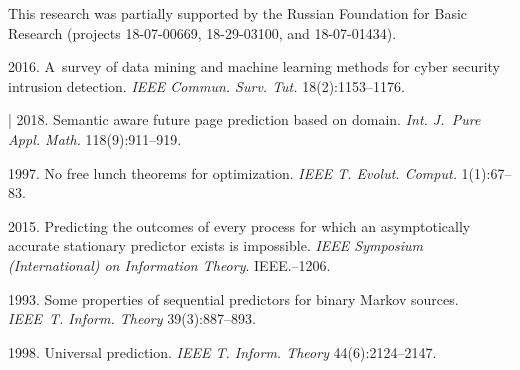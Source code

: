 


\vspace*{-19pt}

\Ack

\vspace*{-5pt}

\noindent
This research was partially supported by the Russian Foundation for Basic Research (projects 
18-07-00669,  
18-29-03100, and 18-07-01434).

\vspace*{-3pt}

 \begin{multicols}{2}

\renewcommand{\bibname}{\protect\rmfamily References}

{\small\frenchspacing
 {%
 \begin{thebibliography}{99}

 2016. A~survey of data mining and machine learning 
methods for cyber security intrusion detection. \textit{IEEE Commun. Surv. 
Tut.} 18(2):1153--1176.
{

}


| 2018. Semantic aware future page prediction based on 
domain. \textit{Int. J.~Pure Appl. Math.} 118(9):911--919.

\vspace*{-2pt}

 1997. No free lunch theorems for optimization. 
\textit{IEEE T. Evolut. Comput.} 1(1):67--83.

 2015. Predicting the outcomes of every process for which 
an asymptotically accurate stationary predictor exists is impossible. \textit{IEEE 
Symposium (International) on Information Theory}. IEEE.--1206.

 1993. Some properties of sequential predictors 
for binary Markov sources. \textit{IEEE~T. Inform. Theory} 39(3):887--893.

 1998. Universal prediction. \textit{IEEE T. Inform. 
Theory} 44(6):2124--2147.


\end{thebibliography}}}
\end{multicols}
